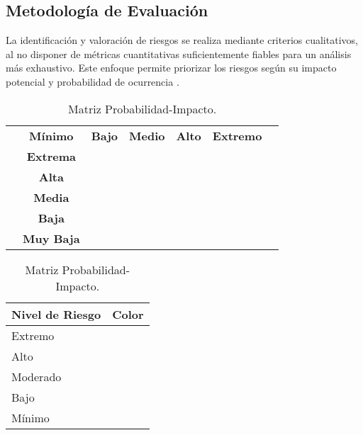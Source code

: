 \subsection*{Metodología de Evaluación}
La identificación y valoración de riesgos se realiza mediante criterios cualitativos, al no disponer de métricas cuantitativas suficientemente fiables para un análisis más exhaustivo. Este enfoque permite priorizar los riesgos según su impacto potencial y probabilidad de ocurrencia \cite{carmona2021gestion}.

\begin{table}[H]
\centering
\begin{tabular}{|>{\hsize=1.1\hsize}c|>{\hsize=1.1\hsize}c|c|c|c|c|c|}
\hline
\rowcolor{gray!25}
\multicolumn{2}{|c|}{\multirow{2}{*}{}} & \multicolumn{5}{c|}{\textbf{Impacto}} \\
\cline{3-7}
\multicolumn{2}{|c|}{} & \textbf{Mínimo} & \textbf{Bajo} & \textbf{Medio} & \textbf{Alto} & \textbf{Extremo} \\ \hline

\multirow{6}{*}{\rotatebox{90}{\textbf{Probabilidad}}} 
& \textbf{Extrema} & \cellcolor{greenrisk} & \cellcolor{yellowrisk} & \cellcolor{orangerisk} & \cellcolor{redrisk} & \cellcolor{redrisk} \\ \cline{2-7}
& \textbf{Alta} & \cellcolor{greenrisk} & \cellcolor{greenrisk} & \cellcolor{yellowrisk} & \cellcolor{orangerisk} & \cellcolor{redrisk} \\ \cline{2-7}
& \textbf{Media} & \cellcolor{bluerisk} & \cellcolor{greenrisk} & \cellcolor{greenrisk} & \cellcolor{yellowrisk} & \cellcolor{orangerisk} \\ \cline{2-7}
& \textbf{Baja} & \cellcolor{bluerisk} & \cellcolor{bluerisk} & \cellcolor{greenrisk} & \cellcolor{greenrisk} & \cellcolor{yellowrisk} \\ \cline{2-7}
& \textbf{Muy Baja} & \cellcolor{bluerisk} & \cellcolor{bluerisk} & \cellcolor{bluerisk} & \cellcolor{greenrisk} & \cellcolor{greenrisk} \\ \hline
\end{tabular}

\vspace{5mm}

\begin{tabular}{|l|l|}
\hline
\rowcolor{gray!25}
\textbf{Nivel de Riesgo} & \textbf{Color} \\ \hline
Extremo & \cellcolor{redrisk} \\ \hline
Alto & \cellcolor{orangerisk} \\ \hline
Moderado & \cellcolor{yellowrisk} \\ \hline
Bajo & \cellcolor{greenrisk} \\ \hline
Mínimo & \cellcolor{bluerisk} \\ \hline
\end{tabular}
\caption{Matriz Probabilidad-Impacto.}
\label{tab:matrizpi}
\end{table}

